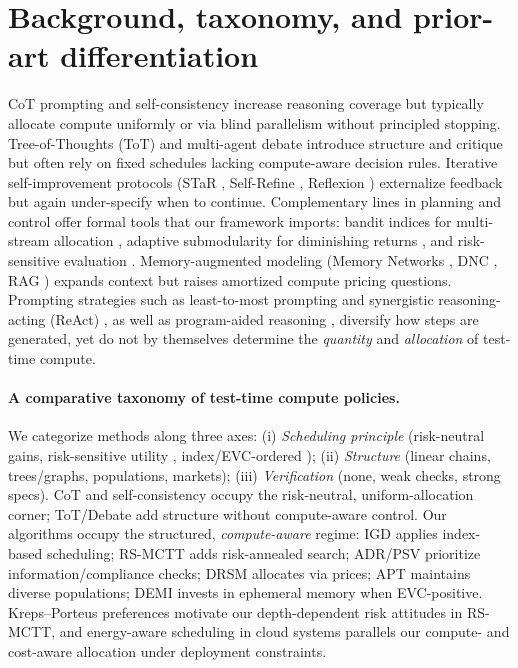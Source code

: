 \section{Background, taxonomy, and prior-art differentiation}
CoT prompting \cite{wei2022cot} and self-consistency \cite{wang2023selfconsistency} increase reasoning coverage but typically allocate compute uniformly or via blind parallelism without principled stopping. Tree-of-Thoughts (ToT) \cite{yao2023tot} and multi-agent debate \cite{irving2018debate} introduce structure and critique but often rely on fixed schedules lacking compute-aware decision rules. Iterative self-improvement protocols (STaR \cite{zelikman2022star}, Self-Refine \cite{madaan2023selfrefine}, Reflexion \cite{shinn2023reflexion}) externalize feedback but again under-specify when to continue. Complementary lines in planning and control offer formal tools that our framework imports: bandit indices for multi-stream allocation \cite{gittins1979,whittle1988restless}, adaptive submodularity for diminishing returns \cite{golovin2011adaptive}, and risk-sensitive evaluation \cite{howard1972risk,ahmadi2012entropic}. Memory-augmented modeling (Memory Networks \cite{weston2015memnn}, DNC \cite{graves2016dnc}, RAG \cite{lewis2020rag}) expands context but raises amortized compute pricing questions. Prompting strategies such as least-to-most prompting \cite{zhou2022leasttomost} and synergistic reasoning-acting (ReAct) \cite{yao2022react}, as well as program-aided reasoning \cite{gao2023pal}, diversify how steps are generated, yet do not by themselves determine the \emph{quantity} and \emph{allocation} of test-time compute.

\paragraph{A comparative taxonomy of test-time compute policies.}
We categorize methods along three axes:
(i) \emph{Scheduling principle} (risk-neutral gains, risk-sensitive utility \cite{howard1972risk,ahmadi2012entropic}, index/EVC-ordered \cite{gittins1979});
(ii) \emph{Structure} (linear chains, trees/graphs, populations, markets);
(iii) \emph{Verification} (none, weak checks, strong specs).
CoT and self-consistency occupy the risk-neutral, uniform-allocation corner; ToT/Debate add structure without compute-aware control. Our algorithms occupy the structured, \emph{compute-aware} regime: IGD applies index-based scheduling; RS-MCTT adds risk-annealed search; ADR/PSV prioritize information/compliance checks; DRSM allocates via prices; APT maintains diverse populations; DEMI invests in ephemeral memory when EVC-positive. Kreps–Porteus preferences \cite{kreps1978temporal} motivate our depth-dependent risk attitudes in RS-MCTT, and energy-aware scheduling in cloud systems \cite{beloglazov2012cloud} parallels our compute- and cost-aware allocation under deployment constraints.

